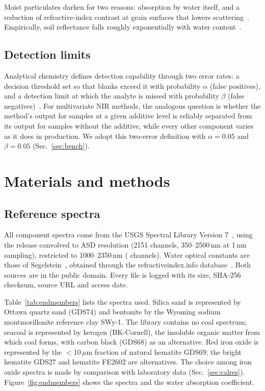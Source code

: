 \documentclass[10pt,twocolumn,letterpaper]{article}
\newcommand{\um}{\,$\mu$m}
\begin{document}
Moist particulates darken for two reasons: absorption by water itself, and a reduction of refractive-index contrast at grain surfaces that lowers scattering~\cite{lekner1988}. Empirically, soil reflectance falls roughly exponentially with water content~\cite{lobell2002}.

\subsection{Detection limits}

Analytical chemistry defines detection capability through two error rates: a decision threshold set so that blanks exceed it with probability $\alpha$ (false positives), and a detection limit at which the analyte is missed with probability $\beta$ (false negatives)~\cite{currie1968,currie1995}. For multivariate NIR methods, the analogous question is whether the method's output for samples at a given additive level is reliably separated from its output for samples without the additive, while every other component varies as it does in production. We adopt this two-error definition with $\alpha=0.05$ and $\beta=0.05$ (Sec.~\ref{sec:bench}).

\section{Materials and methods}\label{sec:methods}

\subsection{Reference spectra}

All component spectra come from the USGS Spectral Library Version 7~\cite{kokaly2017data,kokaly2017ds}, using the release convolved to ASD resolution (2151 channels, 350--2500\,nm at 1\,nm sampling), restricted to 1000--2350\,nm (\nNative{} channels). Water optical constants are those of Segelstein~\cite{segelstein1981}, obtained through the refractiveindex.info database~\cite{polyanskiy2024}. Both sources are in the public domain. Every file is logged with its size, SHA-256 checksum, source URL and access date.

Table~\ref{tab:endmembers} lists the spectra used. Silica sand is represented by Ottawa quartz sand (GDS74) and bentonite by the Wyoming sodium montmorillonite reference clay SWy-1. The library contains no coal spectrum; seacoal is represented by kerogen (BK-Cornell), the insoluble organic matter from which coal forms, with carbon black (GDS68) as an alternative. Red iron oxide is represented by the $<$10\um{} fraction of natural hematite GDS69; the bright hematite GDS27 and hematite FE2602 are alternatives. The choice among iron oxide spectra is made by comparison with laboratory data (Sec.~\ref{sec:calres}). Figure~\ref{fig:endmembers} shows the spectra and the water absorption coefficient.
\end{document}
